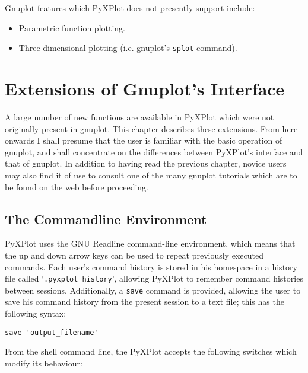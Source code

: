 \documentclass[a4paper,onecolumn,11pt]{book}
\begin{document}
Gnuplot features which PyXPlot does not presently support include:

\begin{itemize}
\item Parametric function plotting.
\item Three-dimensional plotting (i.e. gnuplot's \texttt{splot} command).
\end{itemize}

\chapter{Extensions of Gnuplot's Interface}
\label{new_features}

A large number of new functions are available in PyXPlot which were not
originally present in gnuplot. This chapter describes these extensions.  From
here onwards I shall presume that the user is familiar with the basic operation
of gnuplot, and shall concentrate on the differences between PyXPlot's
interface and that of gnuplot. In addition to having read the previous chapter,
novice users may also find it of use to consult one of the many gnuplot
tutorials which are to be found on the web before proceeding.

\section{The Commandline Environment}

PyXPlot uses the GNU Readline command-line environment, which means that the up
and down arrow keys can be used to repeat previously executed commands. Each
user's command history is stored in his homespace in a history file called
`\texttt{.pyxplot\_history}', allowing PyXPlot to remember command histories
between sessions. Additionally, a \texttt{save} command is provided, allowing
the user to save his command history from the present session to a text file;
this has the following syntax:

\begin{verbatim}
save 'output_filename'
\end{verbatim}

From the shell command line, the PyXPlot accepts the following switches which
modify its behaviour:
\end{document}
